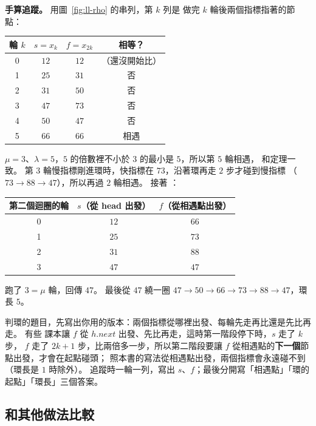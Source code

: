 \textbf{手算追蹤。} 用圖~\ref{fig:ll-rho} 的串列，第 $k$ 列是  做完
$k$ 輪後兩個指標指著的節點：

\begin{center}
\begin{tabular}{cccc}
\toprule
輪 $k$ & $s = x_k$ & $f = x_{2k}$ & 相等？ \\
\midrule
0 & $12$ & $12$ & （還沒開始比）\\
1 & $25$ & $31$ & 否 \\
2 & $31$ & $50$ & 否 \\
3 & $47$ & $73$ & 否 \\
4 & $50$ & $47$ & 否 \\
5 & $66$ & $66$ & 相遇 \\
\bottomrule
\end{tabular}
\end{center}

$\mu = 3$、$\lambda = 5$，$5$ 的倍數裡不小於 $3$ 的最小是 $5$，所以第 $5$ 輪相遇，
和定理一致。 第 $3$ 輪慢指標剛進環時，快指標在 $73$，沿著環再走 $2$ 步才碰到慢指標
（$73 \to 88 \to 47$），所以再過 $2$ 輪相遇。 接著 ：

\begin{center}
\begin{tabular}{ccc}
\toprule
第二個迴圈的輪 & $s$（從 head 出發）& $f$（從相遇點出發）\\
\midrule
0 & $12$ & $66$ \\
1 & $25$ & $73$ \\
2 & $31$ & $88$ \\
3 & $47$ & $47$ \\
\bottomrule
\end{tabular}
\end{center}

跑了 $3 = \mu$ 輪，回傳 $47$。 最後從 $47$ 繞一圈 $47 \to 50 \to 66 \to 73 \to 88 \to
47$，環長 $5$。

\begin{examnote}
判環的題目，先寫出你用的版本：兩個指標從哪裡出發、每輪先走再比還是先比再走。 有些
課本讓 $f$ 從 $h.\mathit{next}$ 出發、先比再走，這時第一階段停下時，$s$ 走了 $k$ 步，
$f$ 走了 $2k + 1$ 步，比兩倍多一步，所以第二階段要讓 $f$ 從相遇點的\textbf{下一個}節點出發，才會在起點碰頭；
照本書的寫法從相遇點出發，兩個指標會永遠碰不到（環長是 $1$ 時除外）。 追蹤時一輪一列，寫出
$s$、$f$；最後分開寫「相遇點」「環的起點」「環長」三個答案。
\end{examnote}

\subsection{和其他做法比較}

